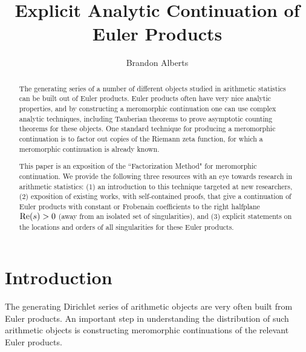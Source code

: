 \documentclass[12pt]{amsart}
\title{Explicit Analytic Continuation of Euler Products}
\author{Brandon Alberts}
\theoremstyle{plain}
\begin{document}
\begin{abstract}
The generating series of a number of different objects studied in arithmetic statistics can be built out of Euler products. Euler products often have very nice analytic properties, and by constructing a meromorphic continuation one can use complex analytic techniques, including Tauberian theorems to prove asymptotic counting theorems for these objects. One standard technique for producing a meromorphic continuation is to factor out copies of the Riemann zeta function, for which a meromorphic continuation is already known.

This paper is an exposition of the ``Factorization Method" for meromorphic continuation. We provide the following three resources with an eye towards research in arithmetic statistics: (1) an introduction to this technique targeted at new researchers, (2) exposition of existing works, with self-contained proofs, that give a continuation of Euler products with constant or Frobenain coefficients to the right halfplane ${\rm Re}(s)>0$ (away from an isolated set of singularities), and (3) explicit statements on the locations and orders of all singularities for these Euler products.
\end{abstract}

\maketitle
\vspace{-1.2cm}
\setcounter{tocdepth}{1}
\tableofcontents
\newpage
\section{Introduction}

The generating Dirichlet series of arithmetic objects are very often built from Euler products. An important step in understanding the distribution of such arithmetic objects is constructing meromorphic continuations of the relevant Euler products.
\end{document}
